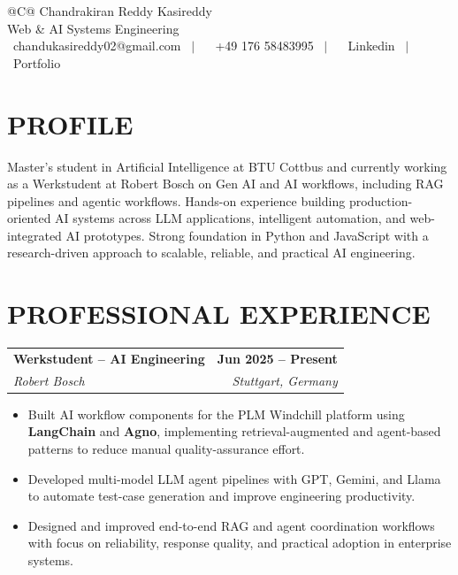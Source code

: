 \documentclass[a4paper,11pt]{article}
\makeatletter
\newcommand{\entryheader}[4]{%
  \begin{tabularx}{\textwidth}{@{}>{\RaggedRight\arraybackslash}X r@{}}
    \textbf{#1} & \textbf{#2} \\
    \textit{#3} & \textit{#4} \\
  \end{tabularx}%
}
\newenvironment{entrybullets}{%
  \begin{minipage}[t]{0.77\textwidth}
    \begin{itemize}[leftmargin=*,label=\textbullet,align=left]
}{%
    \end{itemize}
  \end{minipage}
}
\newcommand{\safehref}[2]{#2}
\let\href\safehref
\makeatother
\begin{document}
\pagestyle{empty}

\begin{tabularx}{\linewidth}{@{}C@{}}
  \Huge{Chandrakiran Reddy Kasireddy}\\[10pt]
  
  \large{ Web \& AI Systems Engineering}\\[3pt]


  \href{mailto: chandukasireddy02@gmail.com}{\raisebox{-0.05\height}{\faEnvelope} \ chandukasireddy02@gmail.com} \ $|$ \
  \href{tel:+49 176 58483995}{ \ +49 176 58483995} \ $|$ \
  \href{https://www.linkedin.com/in/chandukasireddy/}{\raisebox{-0.05\height}{\faLinkedin} \ Linkedin} \ $|$ \
  \href{https://chandu.graspins.com/}{\raisebox{-0.05\height}{\faLink} \ Portfolio}\\
\end{tabularx}

\section*{PROFILE}
Master's student in Artificial Intelligence at BTU Cottbus and currently working as a Werkstudent at Robert Bosch on Gen AI and AI workflows, including RAG pipelines and agentic workflows. Hands-on experience building production-oriented AI systems across LLM applications, intelligent automation, and web-integrated AI prototypes. Strong foundation in Python and JavaScript with a research-driven approach to scalable, reliable, and practical AI engineering.


\section*{PROFESSIONAL EXPERIENCE}
\entryheader{Werkstudent -- AI Engineering}{Jun 2025 -- Present}{Robert Bosch}{Stuttgart, Germany}
\begin{entrybullets}
  \item Built AI workflow components for the PLM Windchill platform using \textbf{LangChain} and \textbf{Agno}, implementing retrieval-augmented and agent-based patterns to reduce manual quality-assurance effort.
  \item Developed multi-model LLM agent pipelines with GPT, Gemini, and Llama to automate test-case generation and improve engineering productivity.
  \item Designed and improved end-to-end RAG and agent coordination workflows with focus on reliability, response quality, and practical adoption in enterprise systems.
\end{entrybullets}
\end{document}
